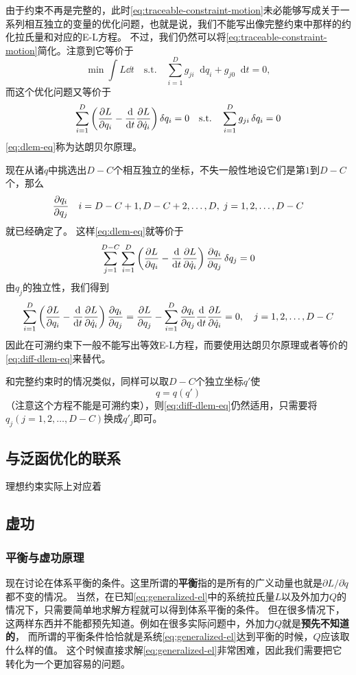 \documentclass[UTF8, a4paper]{ctexart}
\newcommand*{\diff}{\mathop{}\!\mathrm{d}}
\newcommand*{\st}{\quad \text{s.t.} \quad}
\begin{document}
由于约束不再是完整的，此时\eqref{eq:traceable-constraint-motion}未必能够写成关于一系列相互独立的变量的优化问题，也就是说，我们不能写出像完整约束中那样的约化拉氏量和对应的E-L方程。
不过，我们仍然可以将\eqref{eq:traceable-constraint-motion}简化。注意到它等价于
\[
    \min \int L \dd{t} \st \sum_{i=1}^D g_{ji} \diff q_i + g_{j0} \diff t = 0,
\]
而这个优化问题又等价于
\begin{equation}
    \sum_{i=1}^D \left( \pdv{L}{q_i} - \dv{t} \pdv{L}{\dot{q}_i} \right) \delta q_i = 0 \st \sum_{i=1}^D g_{ji} \var{q_i} = 0
    \label{eq:dlem-eq}
\end{equation}
\eqref{eq:dlem-eq}称为达朗贝尔原理。

现在从诸$q$中挑选出$D-C$个相互独立的坐标，不失一般性地设它们是第$1$到$D-C$个，那么
\[
    \pdv{q_i}{q_j} \quad i = D-C+1, D-C+2, \ldots, D, \; j = 1, 2, \ldots, D-C
\]
就已经确定了。
这样\eqref{eq:dlem-eq}就等价于
\[
    \sum_{j=1}^{D-C} \sum_{i=1}^D \left( \pdv{L}{q_i} - \dv{t} \pdv{L}{\dot{q}_i} \right) \pdv{q_i}{q_j} \var{q_j} = 0
\]
由$q_j$的独立性，我们得到
\begin{equation}
    \sum_{i=1}^D \left( \pdv{L}{q_i} - \dv{t} \pdv{L}{\dot{q}_i} \right) \pdv{q_i}{q_j} = \pdv{L}{q_j} - \sum_{i=1}^D \pdv{q_i}{q_j} \dv{t} \pdv{L}{\dot{q}_i} = 0, \quad j = 1, 2, \ldots, D-C
    \label{eq:diff-dlem-eq}
\end{equation}
因此在可溯约束下一般不能写出等效E-L方程，而要使用达朗贝尔原理或者等价的\eqref{eq:diff-dlem-eq}来替代。

和完整约束时的情况类似，同样可以取$D-C$个独立坐标$q'$使
\[
    q = q(q')
\]
（注意这个方程不能是可溯约束），则\eqref{eq:diff-dlem-eq}仍然适用，只需要将$q_j(j = 1, 2, \ldots, D-C)$换成$q'_j$即可。

\subsection{与泛函优化的联系}
理想约束实际上对应着

\subsection{虚功}

\subsubsection{平衡与虚功原理}
现在讨论在体系平衡的条件。这里所谓的\textbf{平衡}指的是所有的广义动量也就是$\partial L / \partial \dot{q}$都不变的情况。
当然，在已知\eqref{eq:generalized-el}中的系统拉氏量$L$以及外加力$Q$的情况下，只需要简单地求解方程就可以得到体系平衡的条件。
但在很多情况下，这两样东西并不能都预先知道。例如在很多实际问题中，外加力$Q$就是\textbf{预先不知道的}，
而所谓的平衡条件恰恰就是系统\eqref{eq:generalized-el}达到平衡的时候，$Q$应该取什么样的值。
这个时候直接求解\eqref{eq:generalized-el}非常困难，因此我们需要把它转化为一个更加容易的问题。
\end{document}
